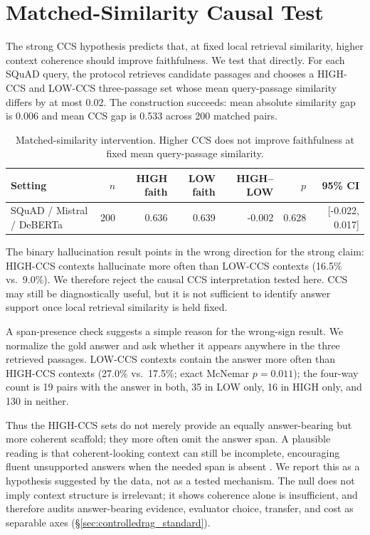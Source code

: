 \section{Matched-Similarity Causal Test}
\label{sec:matched_similarity}

The strong CCS hypothesis predicts that, at fixed local retrieval similarity,
higher context coherence should improve faithfulness. We test that directly.
For each SQuAD query, the protocol retrieves candidate passages and chooses a
HIGH-CCS and LOW-CCS three-passage set whose mean query-passage similarity
differs by at most 0.02. The construction succeeds: mean absolute similarity
gap is 0.006 and mean CCS gap is 0.533 across 200 matched pairs.

\begin{table}[H]
\centering
\small
\caption{Matched-similarity intervention. Higher CCS does not improve
faithfulness at fixed mean query-passage similarity.}
\label{tab:causal}
\begin{tabular}{lrrrrrr}
\toprule
Setting & \(n\) & HIGH faith & LOW faith & HIGH--LOW & \(p\) & 95\% CI \\
\midrule
SQuAD / Mistral / DeBERTa & 200 & 0.636 & 0.639 & -0.002 & 0.628 & [-0.022, 0.017] \\
\bottomrule
\end{tabular}
\end{table}

The binary hallucination result points in the wrong direction for the strong
claim: HIGH-CCS contexts hallucinate more often than LOW-CCS contexts
(16.5\% vs.\ 9.0\%). We therefore reject the causal CCS interpretation tested
here. CCS may still be diagnostically useful, but it is not sufficient to
identify answer support once local retrieval similarity is held fixed.

A span-presence check suggests a simple reason for the wrong-sign result. We
normalize the gold answer and ask whether it appears anywhere in the three
retrieved passages. LOW-CCS contexts contain the answer more often than
HIGH-CCS contexts (27.0\% vs.\ 17.5\%; exact McNemar \(p=0.011\)); the
four-way count is 19 pairs with the answer in both, 35 in LOW only, 16 in HIGH
only, and 130 in neither.

Thus the HIGH-CCS sets do not merely provide an equally answer-bearing but
more coherent scaffold; they more often omit the answer span. A plausible
reading is that coherent-looking context can still be incomplete, encouraging
fluent unsupported answers when the needed span is absent
\citep{maynez2020faithfulness}. We report this as a hypothesis suggested by
the data, not as a tested mechanism. The null does not imply context
structure is irrelevant; it shows coherence alone is insufficient, and
\method{} therefore audits answer-bearing evidence, evaluator choice,
transfer, and cost as separable axes (\S\ref{sec:controlledrag_standard}).

